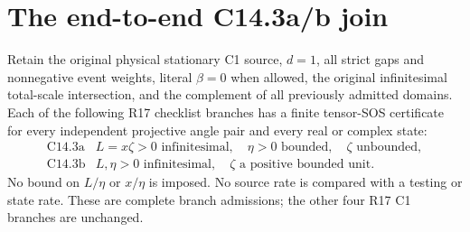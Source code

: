 \section{The end-to-end C14.3a/b join}
\label{sec:r18-c143ab-join}

\begin{theorem}
Retain the original physical stationary C1 source, $d=1$, all strict
gaps and nonnegative event weights, literal $\beta=0$ when allowed,
the original infinitesimal total-scale intersection, and the
complement of all previously admitted domains.  Each of the following
R17 checklist branches has a finite tensor-SOS certificate for every
independent projective angle pair and every real or complex state:
\[
\begin{array}{c|l}
 \mathrm{C14.3a}&L=x\zeta>0\text{ infinitesimal},\quad
          \eta>0\text{ bounded},\quad\zeta\text{ unbounded},\\
 \mathrm{C14.3b}&L,\eta>0\text{ infinitesimal},\quad
          \zeta\text{ a positive bounded unit}.
\end{array}
\]
No bound on $L/\eta$ or $x/\eta$ is imposed.  No source rate is
compared with a testing or state rate.  These are complete branch
admissions; the other four R17 C1 branches are unchanged.
\end{theorem}

